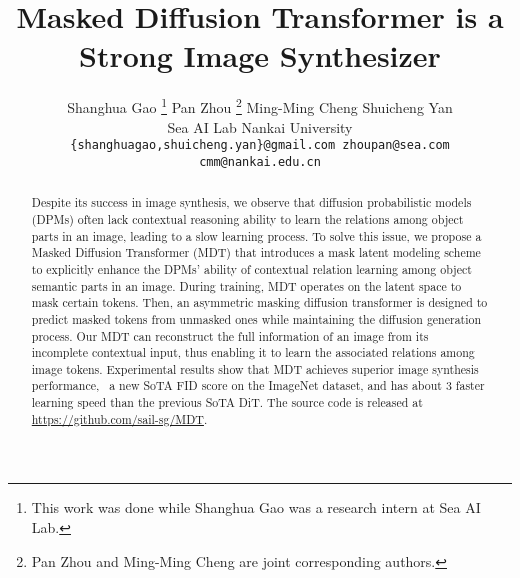 \documentclass[final]{cvpr}
\begin{document}
\title{Masked Diffusion Transformer is a Strong Image Synthesizer}

\author{Shanghua Gao
\thanks{This work was done while Shanghua Gao was a research intern at Sea AI Lab.} \quad
Pan Zhou \thanks{Pan Zhou and Ming-Ming Cheng are joint corresponding authors.} \quad
Ming-Ming Cheng \quad
Shuicheng Yan \\
Sea AI Lab \quad Nankai University \\
\texttt{\{shanghuagao,shuicheng.yan\}@gmail.com  zhoupan@sea.com cmm@nankai.edu.cn} \\
}



\maketitle



\begin{abstract}


Despite its success in image synthesis, 	
we observe that diffusion probabilistic models (DPMs) often 
lack contextual reasoning ability to learn the relations among object parts 
in an image, leading to a slow learning process. 
To solve this issue, we propose a Masked Diffusion Transformer (MDT) 
that introduces a mask latent modeling scheme to 
explicitly enhance the DPMs' ability of contextual relation learning among object semantic parts in an image. 
During training,
MDT operates on the latent space to mask certain tokens.
Then, an asymmetric masking diffusion transformer 
is designed to predict masked tokens from unmasked ones while maintaining the diffusion generation process.
Our MDT can reconstruct the full information of an image 
from its incomplete contextual input, 
thus enabling it to learn the associated relations among image tokens. 
Experimental results show that MDT achieves superior 
image synthesis performance, \eg~a new SoTA FID score on the ImageNet
dataset, and has about 3 faster learning speed 
than the previous SoTA DiT. 
The source code is released at \url{https://github.com/sail-sg/MDT}.

\end{abstract}



\newcommand{\addImg}[2]{\texttt{[image: \#1/sample304\_\#2]}}

\newcommand{\addImgs}[1]{\addImg{#1}{05} &\addImg{#1}{1} &\addImg{#1}{2} &\addImg{#1}{3} &\addImg{#1}{30}}
\end{document}
